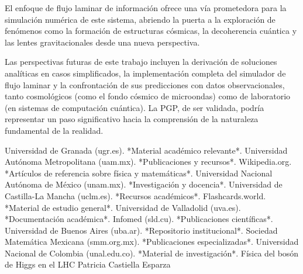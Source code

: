 \documentclass{book} %
\begin{document}
El enfoque de flujo laminar de información ofrece una vía prometedora para la simulación numérica de este sistema, abriendo la puerta a la exploración de fenómenos como la formación de estructuras cósmicas, la decoherencia cuántica y las lentes gravitacionales desde una nueva perspectiva.

Las perspectivas futuras de este trabajo incluyen la derivación de soluciones analíticas en casos simplificados, la implementación completa del simulador de flujo laminar y la confrontación de sus predicciones con datos observacionales, tanto cosmológicos (como el fondo cósmico de microondas) como de laboratorio (en sistemas de computación cuántica). La PGP, de ser validada, podría representar un paso significativo hacia la comprensión de la naturaleza fundamental de la realidad.

\backmatter

\begin{thebibliography}{99}
     Universidad de Granada (ugr.es). *Material académico relevante*.
     Universidad Autónoma Metropolitana (uam.mx). *Publicaciones y recursos*.
     Wikipedia.org. *Artículos de referencia sobre física y matemáticas*.
     Universidad Nacional Autónoma de México (unam.mx). *Investigación y docencia*.
     Universidad de Castilla-La Mancha (uclm.es). *Recursos académicos*.
     Flashcards.world. *Material de estudio general*.
     Universidad de Valladolid (uva.es). *Documentación académica*.
     Infomed (sld.cu). *Publicaciones científicas*.
     Universidad de Buenos Aires (uba.ar). *Repositorio institucional*.
     Sociedad Matemática Mexicana (smm.org.mx). *Publicaciones especializadas*.
     Universidad Nacional de Colombia (unal.edu.co). *Material de investigación*. 
     Física del bosón de
Higgs en el LHC
Patricia Castiella Esparza
\end{thebibliography}
\end{document}
